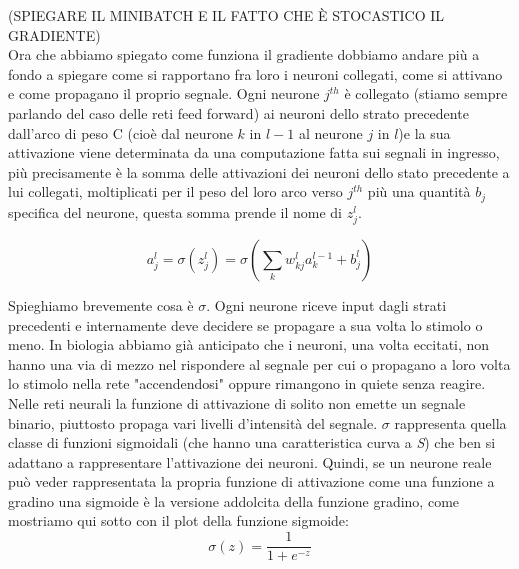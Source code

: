 (SPIEGARE IL MINIBATCH E IL FATTO CHE È STOCASTICO IL GRADIENTE)
\\
Ora che abbiamo spiegato come funziona il gradiente dobbiamo andare più a fondo a spiegare come si rapportano fra loro i neuroni collegati, come si attivano e come propagano il proprio segnale.
Ogni neurone $j^{th}$ è collegato (stiamo sempre parlando del caso delle reti feed forward) ai neuroni dello strato precedente dall'arco di peso C (cioè dal neurone $k$ in $l-1$ al neurone $j$ in $l$)e la sua attivazione viene determinata da una computazione fatta sui segnali in ingresso, più precisamente è la somma delle attivazioni dei neuroni dello stato precedente a lui collegati, moltiplicati per il peso del loro arco verso $j^{th}$ più una quantità $b_{j}$ specifica del neurone, questa somma prende il nome di $z^{l}_{j}$. 

\begin{equation}
\displaystyle a^{l}_{j}=\sigma\left( z^{l}_{j}\right) = \sigma \left( \sum_{k}w^{l}_{kj}a^{l-1}_k +b^{l}_{j} \right)
\end{equation}

Spieghiamo brevemente cosa è $\sigma$. Ogni neurone riceve input dagli strati precedenti e internamente deve decidere se propagare a sua volta lo stimolo o meno. In biologia abbiamo già anticipato che i neuroni, una volta eccitati, non hanno una via di mezzo nel rispondere al segnale per cui o propagano a loro volta lo stimolo nella rete "accendendosi"  oppure rimangono in quiete senza reagire. Nelle reti neurali la funzione di attivazione di solito non emette un segnale binario, piuttosto propaga vari livelli d'intensità del segnale. $\sigma$ rappresenta quella classe di funzioni sigmoidali (che hanno una caratteristica curva a \textit{S}) che ben si adattano a rappresentare l'attivazione dei neuroni. Quindi, se un neurone reale può veder rappresentata la propria funzione di attivazione come una funzione a gradino una sigmoide è la versione addolcita della funzione gradino, come mostriamo qui sotto con il plot della funzione sigmoide:
\begin{equation}
	\sigma(z)=\dfrac{1}{1+e^{-z}}
\end{equation}

